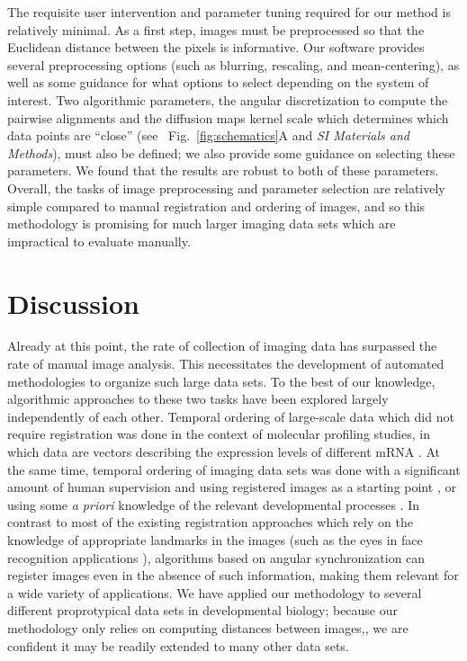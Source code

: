 \documentclass[twocolumn, 10pt]{article}
\newcommand{\SI}[0]{\textit{SI Materials and Methods}}
\newcommand{\fig}[0]{Fig.}
\begin{document}
The requisite user intervention and parameter tuning required for our method is relatively minimal.
%
As a first step, images must be preprocessed so that the Euclidean distance between the pixels is informative.
%
Our software provides several preprocessing options (such as blurring, rescaling, and mean-centering), as well as some guidance for what options to select depending on the system of interest. 
%
Two algorithmic parameters, the angular discretization to compute the pairwise alignments and the diffusion maps kernel scale which determines which data points are ``close'' (see ~\fig~\ref{fig:schematics}A and \SI), must also be defined; we also provide some guidance on selecting these parameters.
%
We found that the results are robust to both of these parameters.
%
Overall, the tasks of image preprocessing and parameter selection are relatively simple compared to manual registration and ordering of images, and so this methodology is promising for much larger imaging data sets which are impractical to evaluate manually. 




\section*{Discussion}

Already at this point, the rate of collection of imaging data has surpassed the rate of manual image analysis.
%
This necessitates the development of automated methodologies to organize such large data sets. 
%
To the best of our knowledge, algorithmic approaches to these two tasks have been explored largely independently of each other. 
%
Temporal ordering of large-scale data which did not require registration was done in the context of molecular profiling studies, in which data are vectors describing the expression levels of different mRNA \citep{anavy2014blind, trapnell2014dynamics, gupta2008extracting}.
%
At the same time, temporal ordering of imaging data sets was done with a significant amount of human supervision and using registered images as a starting point \citep{yuan2014automated, surkova2008characterization}, or using some {\em a priori} knowledge of the relevant developmental processes \citep{dubuis2013accurate}.  
%
%
In contrast to most of the existing registration approaches which rely on the knowledge of appropriate landmarks in the images \citep{ian1998statistical} (such as the eyes in face recognition applications \citep{zhao2003face}), algorithms based on angular synchronization can register images even in the absence of such information, making them relevant for a wide variety of applications. 
%
We have applied our methodology to several different proprotypical data sets in developmental biology; because our methodology only relies on computing distances between images,, we are confident it may be readily extended to many other data sets. 
\end{document}
